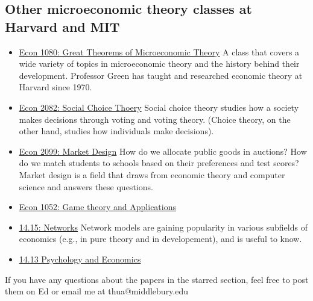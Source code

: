 \subsection*{Other microeconomic theory classes at Harvard and MIT}
\begin{itemize}
    \item \href{https://canvas.harvard.edu/courses/91911}{Econ 1080: Great Theorems of Microeconomic Theory} A class that covers a wide variety of topics in microeconomic theory and the history behind their development. Professor Green has taught and researched economic theory at Harvard since 1970.
    \item \href{https://canvas.harvard.edu/courses/73987/assignments/syllabus}{Econ 2082: Social Choice Thoery} Social choice theory studies how a society makes decisions through voting and voting theory. (Choice theory, on the other hand, studies how individuals make decisions).
    \item \href{https://canvas.harvard.edu/courses/60607}{Econ 2099: Market Design} How do we allocate public goods in auctions? How do we match students to schools based on their preferences and test scores? Market design is a field that draws from economic theory and computer science and answers these questions. 
    \item \href{https://canvas.harvard.edu/courses/85061}{Econ 1052: Game theory and Applications}
    \item \href{https://ocw.mit.edu/courses/14-15j-networks-spring-2018/}{14.15: Networks} Network models are gaining popularity in various subfields of economics (e.g.,\citet{localbayesian} in pure theory and \citet{gossip} in developement), and is useful to know.
    \item \href{https://ocw.mit.edu/courses/14-13-psychology-and-economics-spring-2020/}{14.13 Psychology and Economics}
\end{itemize}

If you have any questions about the papers in the starred section, feel free to post them on Ed or email me at thua@middlebury.edu

